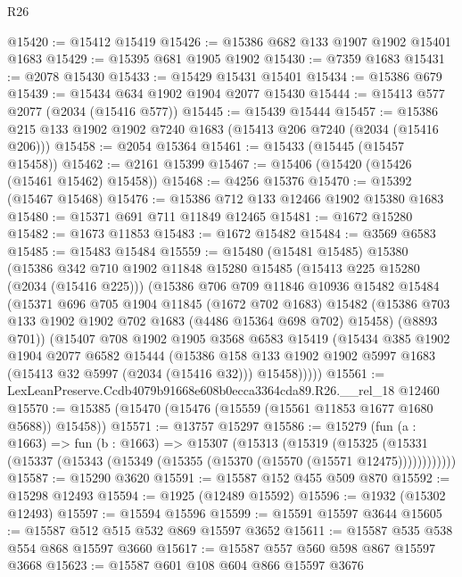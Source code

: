\begin{lexlean}{R26}
\begin{coremodule}
@15420 := @15412 @15419
@15426 := @15386 @682 @133 @1907 @1902 @15401 @1683
@15429 := @15395 @681 @1905 @1902
@15430 := @7359 @1683
@15431 := @2078 @15430
@15433 := @15429 @15431 @15401
@15434 := @15386 @679
@15439 := @15434 @634 @1902 @1904 @2077 @15430
@15444 := @15413 @577 @2077 (@2034 (@15416 @577))
@15445 := @15439 @15444
@15457 := @15386 @215 @133 @1902 @1902 @7240 @1683 (@15413 @206 @7240 (@2034 (@15416 @206)))
@15458 := @2054 @15364
@15461 := @15433 (@15445 (@15457 @15458))
@15462 := @2161 @15399
@15467 := @15406 (@15420 (@15426 (@15461 @15462) @15458))
@15468 := @4256 @15376
@15470 := @15392 (@15467 @15468)
@15476 := @15386 @712 @133 @12466 @1902 @15380 @1683
@15480 := @15371 @691 @711 @11849 @12465
@15481 := @1672 @15280
@15482 := @1673 @11853
@15483 := @1672 @15482
@15484 := @3569 @6583
@15485 := @15483 @15484
@15559 := @15480
    (@15481 @15485)
    @15380
    (@15386
      @342
      @710
      @1902
      @11848
      @15280
      @15485
      (@15413 @225 @15280 (@2034 (@15416 @225)))
      (@15386
        @706
        @709
        @11846
        @10936
        @15482
        @15484
        (@15371
          @696
          @705
          @1904
          @11845
          (@1672 @702 @1683)
          @15482
          (@15386 @703 @133 @1902 @1902 @702 @1683 (@4486 @15364 @698 @702) @15458)
          (@8893 @701))
        (@15407
          @708
          @1902
          @1905
          @3568
          @6583
          @15419
          (@15434
            @385
            @1902
            @1904
            @2077
            @6582
            @15444
            (@15386
              @158
              @133
              @1902
              @1902
              @5997
              @1683
              (@15413 @32 @5997 (@2034 (@15416 @32)))
              @15458)))))
@15561 := LexLeanPreserve.Ccdb4079b91668e608b0ecca3364cda89.R26.__rel_18 @12460
@15570 := @15385 (@15470 (@15476 (@15559 (@15561 @11853 @1677 @1680 @5688)) @15458))
@15571 := @13757 @15297
@15586 := @15279
    (fun (a : @1663) =>
    fun (b : @1663) =>
    @15307
      (@15313
        (@15319
          (@15325 (@15331 (@15337 (@15343 (@15349 (@15355 (@15370 (@15570 (@15571 @12475))))))))))))
@15587 := @15290 @3620
@15591 := @15587 @152 @455 @509 @870
@15592 := @15298 @12493
@15594 := @1925 (@12489 @15592)
@15596 := @1932 (@15302 @12493)
@15597 := @15594 @15596
@15599 := @15591 @15597 @3644
@15605 := @15587 @512 @515 @532 @869 @15597 @3652
@15611 := @15587 @535 @538 @554 @868 @15597 @3660
@15617 := @15587 @557 @560 @598 @867 @15597 @3668
@15623 := @15587 @601 @108 @604 @866 @15597 @3676

\end{coremodule}
\end{lexlean}
